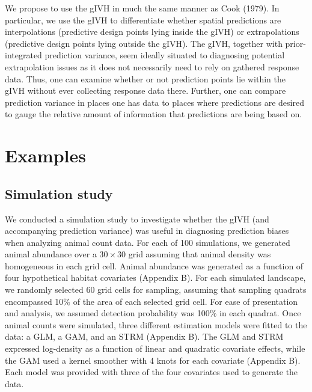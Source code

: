 \documentclass[12pt,english]{article}
\begin{document}
\begin{spacing}{1.9}
We propose to use the gIVH in much the same manner as Cook (1979).  In particular, we use the gIVH to differentiate whether spatial predictions are interpolations (predictive design points lying inside the gIVH) or extrapolations (predictive design points lying outside the gIVH).  The gIVH, together with prior-integrated prediction variance, seem ideally situated to diagnosing potential extrapolation issues as it does not necessarily need to rely on gathered response data. Thus, one can examine whether or not prediction points lie within the gIVH without ever collecting response data there.  Further, one can compare prediction variance in places one has data to places where predictions are desired to gauge the relative amount of information that predictions are being based on.

\section{Examples}

\subsection{Simulation study}

We conducted a simulation study to investigate whether the gIVH (and accompanying prediction variance) was useful in diagnosing prediction biases when analyzing animal count data. For each of 100 simulations, we generated animal abundance over a $30 \times 30$ grid assuming that animal density was homogeneous in each grid cell.  Animal abundance was generated as a function of four hypothetical habitat covariates (Appendix B).   For each simulated landscape, we randomly selected 60 grid cells for sampling, assuming that sampling quadrats encompassed 10\% of the area of each selected grid cell.  For ease of presentation and analysis, we assumed detection probability was 100\% in each quadrat.  Once animal counts were simulated, three different estimation models were fitted to the data: a GLM, a GAM, and an STRM (Appendix B).  The GLM and STRM expressed log-density as a function of linear and quadratic covariate effects, while the GAM used a kernel smoother with 4 knots for each covariate (Appendix B).  Each model was provided with three of the four covariates used to generate the data.


\end{spacing}
\end{document}
